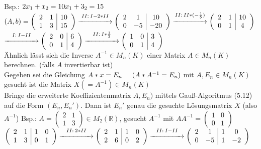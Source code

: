 \documentclass[a4paper,11pt]{article}
\begin{document}
Bsp.: $2x_1+x_2=10 \\
x_1+3_2=15$ \\
$(A,b)=\left(\begin{array}{cc|c}2&1&10\\1&3&15\end{array}\right)\overset{II:\:I-2*II}{\xrightarrow{\hspace*{1.5cm}}}\left(\begin{array}{cc|c}2&1&10\\0&-5&-20\end{array}\right)\overset{II:\:II*(-\frac{1}{5})}{\xrightarrow{\hspace*{1.5cm}}}\left(\begin{array}{cc|c}2&1&10\\0&1&4\end{array}\right)$ \\
$\overset{I:\:I-II}{\xrightarrow{\hspace*{1.5cm}}}\left(\begin{array}{cc|c}2&0&6\\0&1&4\end{array}\right)\overset{II:\:I*\frac{1}{2}}{\xrightarrow{\hspace*{1.5cm}}}\left(\begin{array}{cc|c}1&0&3\\0&1&4\end{array}\right)$ \\
Ähnlich lässt sich die Inverse $A^{-1}\in M_n(K)$ einer Matrix $A\in M_n(K)$ berechnen. (falls $A$ invertierbar ist) \\
Gegeben sei die Gleichung $A*x=E_n\hspace{5mm}(A*A^{-1}=E_n)$ mit $A,E_n\in M_n(K)$ gesucht ist die Matrix $X(=A^{-1})\in M_n(K)$ \\
Bringe die erweiterte Koeffizientenmatrix $A,E_n)$ mittels Gauß-Algoritmus (5.12) auf die Form $(E_n,E_n\prime)$. Dann ist $E_n\prime$ genau die gesuchte Lösungsmatrix $X$ (also $A^{-1}$)
\newpage
Bsp.: $A=\begin{pmatrix}2&1\\1&3\end{pmatrix}\in M_2(\mathbb{R})$, gesucht $A^{-1}$ mit $AA^{-1}=\begin{pmatrix}1&0\\0&1\end{pmatrix}$ \\
$\left(\begin{array}{cc|cc}2&1&1&0\\1&3&0&1\end{array}\right)\overset{II:\:2*II}{\xrightarrow{\hspace*{1.5cm}}}\left(\begin{array}{cc|cc}2&1&1&0\\2&6&0&2\end{array}\right)\overset{II:\:I-II}{\xrightarrow{\hspace*{1.5cm}}}\left(\begin{array}{cc|cc}2&1&1&0\\0&-5&1&-2\end{array}\right)$ \\
\end{document}
